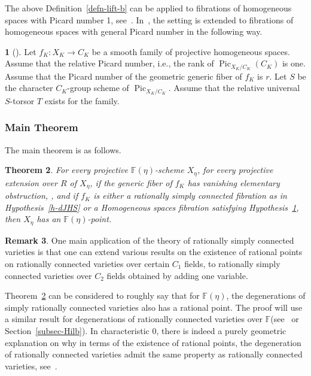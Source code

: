\documentclass[11pt]{article}
\newtheorem{theo}{Theorem}[section]
\theoremstyle{definition}
\newtheorem{rema}[theo]{Remark}
\newcommand{\enoncename}{}
\newtheorem{corpusenonce}[theo]{\enoncename}
\newenvironment{enonce}[1]{\renewcommand{\enoncename}{#1}\begin{corpusenonce}}{\end{corpusenonce}}
\numberwithin{equation}{section}
\numberwithin{figure}{section}
\numberwithin{table}{section}
\newcommand{\mbb}{\mathbb}
\newcommand{\FF}{\mbb{F}}
\newcommand{\Xx}{X}
\newcommand{\Rr}{R}
\newcommand{\FR}{K}
\DeclareMathOperator{\Pic}{Pic}
\begin{document}
The above Definition~\ref{defn-lift-b} can be applied to fibrations of homogeneous spaces with Picard number 1, see~\cite[Section~15]{dJHS}. In~\cite{Zhu}, the setting is extended to fibrations of homogeneous spaces with general Picard number in the following way.

\begin{enonce}
{Hypothesis}[{\cite[5.1]{Zhu}}]\label{h-picard}
Let $f_K \colon X_K \to C_K$ be a smooth family of projective homogeneous spaces.
Assume that the relative Picard number, i.e., the rank of $\Pic_{X_K/C_K} (C_K)$ is one. Assume that the Picard number of the geometric generic fiber of $f_K$ is $r$. Let $S$ be the character $C_K$-group scheme of $\Pic_{X_K/C_K}$. Assume that the relative universal $S$-torsor $T$ exists for the family.
\end{enonce}

\subsubsection{Main Theorem}
The main theorem is as follows.

\begin{theo}\label{thm-app2}
For every projective $\FF(\eta)$-scheme $\Xx_\eta$, for every projective extension over $\Rr$ of $\Xx_\eta$, if the generic fiber of $f_\FR$ has vanishing elementary obstruction, \cite[Section~2.2]{CTSansuc}, and if $f_\FR$ is either a rationally simply connected fibration as in Hypothesis~\ref{h-dJHS} or a Homogeneous spaces fibration satisfying Hypothesis~\ref{h-picard}, then $\Xx_\eta$ has an $\FF(\eta)$-point.
\end{theo}

\begin{rema}
One main application of the theory of rationally simply connected varieties is that one can extend various results on the existence of rational points on rationally connected varieties over certain $C_1$ fields, to rationally simply connected varieties over $C_2$ fields obtained by adding one variable.

Theorem~\ref{thm-app2} can be considered to roughly say that for $\mathbb{F}(\eta)$, the degenerations of simply rationally connected varieties also has a rational point. The proof will use a similar result for degenerations of rationally connected varieties over $\mathbb{F}$(see~\cite{Esnaultpadic, EsnaultXu} or Section~\ref{subsec-Hilb}). In characteristic 0, there is indeed a purely geometric explanation on why in terms of the existence of rational points, the degeneration of rationally connected varieties admit the same property as rationally connected varieties, see~\cite{HogadiXu}.
\end{rema}
\end{document}
